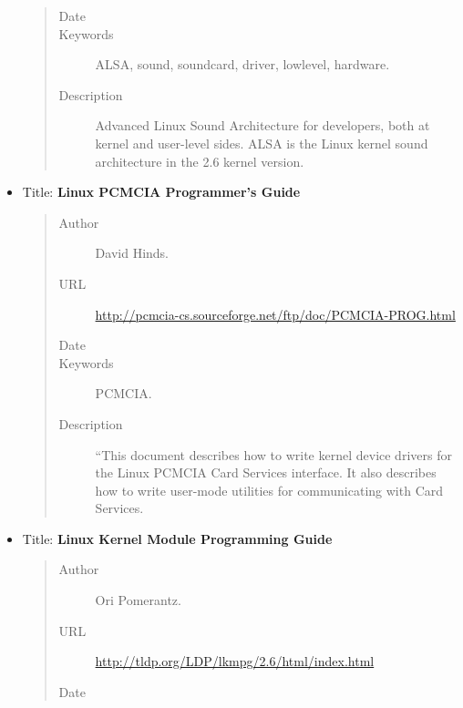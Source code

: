 \documentclass[a4paper,8pt,english]{sphinxmanual}
\begin{document}
\begin{itemize}
\begin{quote}
\begin{description}
\item[{Date}] 

\item[{Keywords}] \leavevmode
ALSA, sound, soundcard, driver, lowlevel, hardware.

\item[{Description}] \leavevmode
Advanced Linux Sound Architecture for developers,
both at kernel and user-level sides. ALSA is the Linux kernel
sound architecture in the 2.6 kernel version.

\end{description}\end{quote}

\item {} 
Title: \textbf{Linux PCMCIA Programmer's Guide}
\begin{quote}\begin{description}
\item[{Author}] \leavevmode
David Hinds.

\item[{URL}] \leavevmode
\href{http://pcmcia-cs.sourceforge.net/ftp/doc/PCMCIA-PROG.html}{http://pcmcia-cs.sourceforge.net/ftp/doc/PCMCIA-PROG.html}

\item[{Date}] 

\item[{Keywords}] \leavevmode
PCMCIA.

\item[{Description}] \leavevmode
``This document describes how to write kernel device
drivers for the Linux PCMCIA Card Services interface. It also
describes how to write user-mode utilities for communicating with
Card Services.

\end{description}\end{quote}

\item {} 
Title: \textbf{Linux Kernel Module Programming Guide}
\begin{quote}\begin{description}
\item[{Author}] \leavevmode
Ori Pomerantz.

\item[{URL}] \leavevmode
\href{http://tldp.org/LDP/lkmpg/2.6/html/index.html}{http://tldp.org/LDP/lkmpg/2.6/html/index.html}

\item[{Date}] 


\end{description}
\end{quote}
\end{itemize}
\end{document}
